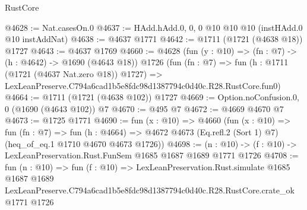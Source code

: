 \begin{lexlean}{RustCore}
\begin{coremodule}
@4628 := Nat.casesOn.{0}
@4637 := HAdd.hAdd.{0, 0, 0} @10 @10 @10 (instHAdd.{0} @10 instAddNat)
@4638 := @4637 @1771
@4642 := @1711 (@1721 (@4638 @18)) @1727
@4643 := @4637 @1769
@4660 := @4628
    (fun (y : @10) => (fn : @7) -> (h : @4642) -> @1690 (@4643 @18))
    @1726
    (fun (fn : @7) =>
    fun (h : @1711 (@1721 (@4637 Nat.zero @18)) @1727) =>
    LexLeanPreserve.C794a6cad1b5e8fdc98d1387794c0d40c.R28.RustCore.fun0)
@4664 := @1711 (@1721 (@4638 @102)) @1727
@4669 := Option.noConfusion.{0, 0} (@1690 (@4643 @102)) @7
@4670 := @495 @7
@4672 := @4669 @4670 @7
@4673 := @1725 @1771
@4690 := fun (x : @10) =>
  @4660
    (fun (x : @10) =>
    fun (fn : @7) =>
    fun (h : @4664) =>
    @4672 @4673 (Eq.refl.{2} (Sort 1) @7) (heq_of_eq.{1} @1710 @4670 @4673 @1726))
@4698 := (n : @10) -> (f : @10) -> LexLeanPreservation.Rust.FunSem @1685 @1687 @1689 @1771 @1726
@4708 := fun (n : @10) =>
  fun (f : @10) =>
  LexLeanPreservation.Rust.simulate
    @1685
    @1687
    @1689
    LexLeanPreserve.C794a6cad1b5e8fdc98d1387794c0d40c.R28.RustCore.crate_ok
    @1771
    @1726
\end{coremodule}
\end{lexlean}
